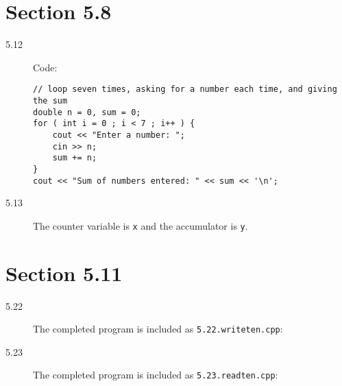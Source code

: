 \documentclass[11pt]{article}
\begin{document}
\section*{Section 5.8}

\begin{description}

	\item[5.12] Code: \begin{lstlisting}
// loop seven times, asking for a number each time, and giving the sum
double n = 0, sum = 0;
for ( int i = 0 ; i < 7 ; i++ ) {
	cout << "Enter a number: ";
	cin >> n;
	sum += n;
}
cout << "Sum of numbers entered: " << sum << '\n';
	\end{lstlisting}
	
	\item[5.13] The counter variable is \texttt{x} and the accumulator is \texttt{y}.
	
\end{description}

\section*{Section 5.11}

\begin{description}

	\item[5.22] The completed program is included as \texttt{5.22.writeten.cpp}:
	
		
		
	\newpage %
	
	\item[5.23] The completed program is included as \texttt{5.23.readten.cpp}:
	
		
	
\end{description}
\end{document}
